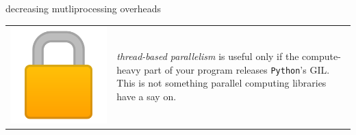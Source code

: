 \documentclass[13pt, usenames,dvipsnames]{beamer} %
\newcommand{\mycode}[2][\tiny] {\texttt{#2}}
\begin{document}
    \begin{frame}[fragile]{decreasing mutliprocessing overheads}
        \begin{tabular}{m{0.5cm} m{10cm}}
            \includegraphics[width=\linewidth] {media/lock-emoji.png} &
            \textit{thread-based parallelism} is useful only if the compute-heavy part
            of your program releases \mycode{Python}'s GIL. This is not
            something parallel computing libraries have a say on. \\
        \end{tabular}
        \vspace{1em}


\end{frame}
\end{document}

